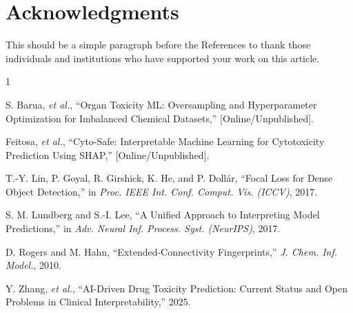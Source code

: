 \documentclass[lettersize,journal]{IEEEtran}
\begin{document}
\section*{Acknowledgments}
This should be a simple paragraph before the References to thank those individuals and institutions who have supported your work on this article.

\begin{thebibliography}{1}


S. Barua, \textit{et al.}, ``Organ Toxicity ML: Oversampling and Hyperparameter Optimization for Imbalanced Chemical Datasets,'' [Online/Unpublished].

Feitosa, \textit{et al.}, ``Cyto-Safe: Interpretable Machine Learning for Cytotoxicity Prediction Using SHAP,'' [Online/Unpublished].

T.-Y. Lin, P. Goyal, R. Girshick, K. He, and P. Dollár, ``Focal Loss for Dense Object Detection,'' in \textit{Proc. IEEE Int. Conf. Comput. Vis. (ICCV)}, 2017.

S. M. Lundberg and S.-I. Lee, ``A Unified Approach to Interpreting Model Predictions,'' in \textit{Adv. Neural Inf. Process. Syst. (NeurIPS)}, 2017.

D. Rogers and M. Hahn, ``Extended-Connectivity Fingerprints,'' \textit{J. Chem. Inf. Model.}, 2010.

Y. Zhang, \textit{et al.}, ``AI-Driven Drug Toxicity Prediction: Current Status and Open Problems in Clinical Interpretability,'' 2025.

\end{thebibliography}
\end{document}

